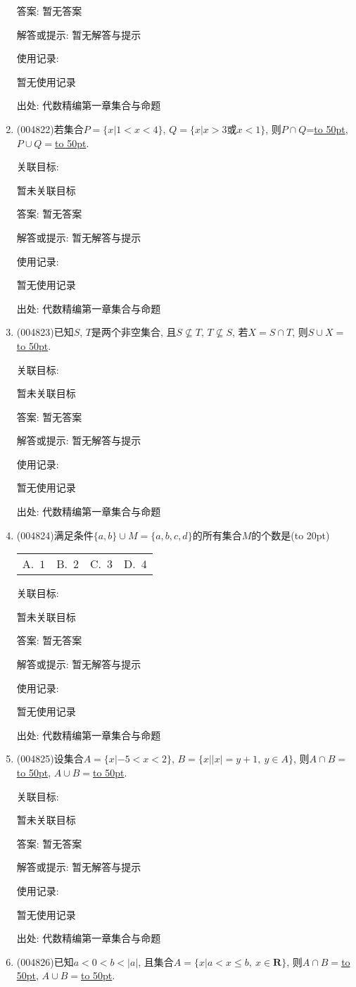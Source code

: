 \documentclass[10pt,a4paper]{article}
\newcommand{\blank}[1]{\underline{\hbox to #1pt{}}}
\newcommand{\bracket}[1]{(\hbox to #1pt{})}
\newcommand{\fourch}[4]{\par\begin{tabular}{p{.23\textwidth}p{.23\textwidth}p{.23\textwidth}p{.23\textwidth}}
A.~#1 &B.~#2& C.~#3& D.~#4
\end{tabular}}
\begin{document}
\begin{enumerate}[1.]
答案: 暂无答案

解答或提示: 暂无解答与提示

使用记录:

暂无使用记录


出处: 代数精编第一章集合与命题
\item { (004822)}若集合$P=\{x|1<x<4\}$, $Q=\{x|x>3\text{或}x<1\}$, 则$P\cap Q$=\blank{50}, $P\cup Q=$\blank{50}.


关联目标:

暂未关联目标

答案: 暂无答案

解答或提示: 暂无解答与提示

使用记录:

暂无使用记录


出处: 代数精编第一章集合与命题
\item { (004823)}已知$S$, $T$是两个非空集合, 且$S\not\subseteq T$, $T\not\subseteq S$, 若$X=S\cap T$, 则$S\cup X=$\blank{50}.


关联目标:

暂未关联目标

答案: 暂无答案

解答或提示: 暂无解答与提示

使用记录:

暂无使用记录


出处: 代数精编第一章集合与命题
\item { (004824)}满足条件$\{a,b\}\cup M=\{a,b,c,d\}$的所有集合$M$的个数是\bracket{20}
\fourch{$1$}{$2$}{$3$}{$4$}


关联目标:

暂未关联目标

答案: 暂无答案

解答或提示: 暂无解答与提示

使用记录:

暂无使用记录


出处: 代数精编第一章集合与命题
\item { (004825)}设集合$A=\{x|-5<x<2\}$, $B=\{x||x|=y+1, \ y\in A\}$, 则$A\cap B=$\blank{50}, $A\cup B=$\blank{50}.


关联目标:

暂未关联目标

答案: 暂无答案

解答或提示: 暂无解答与提示

使用记录:

暂无使用记录


出处: 代数精编第一章集合与命题
\item { (004826)}已知$a<0<b<|a|$, 且集合$A=\{x|a<x\le b, \ x\in \mathbf{R}\}$, 则$A\cap B=$\blank{50}, $A\cup B=$\blank{50}.



\end{enumerate}
\end{document}
